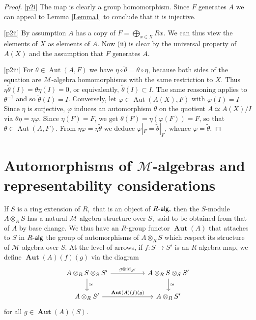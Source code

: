 \documentclass{article}
\theoremstyle{definition}
\def\id{\ensuremath{\operatorname{id}}}
\def\Aut{\ensuremath{\operatorname{Aut}}}
\def\BAut{\ensuremath{\operatorname{\mathbf{Aut}}}}
\def\Ralg{\ensuremath{R\text{-\textup{\textsf{alg}}}}}
\def\Mu{\ensuremath{\mathcal{M}}}
\begin{document}
\begin{proof}
	\ref{p2i} The map is clearly a group homomorphism. Since $F$ generates $A$ we can appeal to Lemma \ref{Lemma1} to conclude that it is injective.

	\ref{p2ii} By assumption $A$ has a copy of $F = \bigoplus_{x \in X} Rx.$ We can thus view the elements of $X$ as elements of $A$. Now (ii) is clear by the universal property of $A(X)$ and the assumption that $F$ generates $A.$

	\ref{p2iii} For $\theta \in \Aut(A,F)$ we have $\eta \circ \widetilde \theta = \theta \circ \eta$, because both sides of the equation are $\Mu$-algebra homomorphisms with the same restriction to $X.$
	Thus $\eta \widetilde \theta (I) = \theta \eta (I) = 0$, or equivalently, $\widetilde \theta(I) \subset I$. The same reasoning applies to $\theta^{-1}$ and so $\widetilde \theta(I) = I$.
	Conversely, let $\varphi \in \Aut(A(X),F)$ with $\varphi(I) = I$. 
	Since $\eta$ is surjective,  
	$\varphi$ induces an automorphism $\theta$ on the quotient $A \simeq A(X)/I$ via $\theta \eta = \eta \varphi$.  Since $\eta(F) = F$, we get $\theta(F) = \eta (\varphi(F)) = F$, so that $\theta \in \Aut(A,F)$.
	From $\eta \varphi = \eta \widetilde \theta$ we deduce $\varphi|_F = \widetilde \theta|_F$, whence $\varphi = \widetilde \theta$.
\end{proof}


\section{Automorphisms of $\Mu$-algebras and representability considerations}

If $S$ is a ring extension of $R,$ that is an object of $\Ralg,$ then the $S$-module $A \otimes_RS$ has a natural $\Mu$-algebra structure over $S,$ said to be obtained from that of $A$ by base change. We thus have an $R$-group functor  $\BAut(A)$ that attaches to $S$ in $\Ralg$ the group of automorphisms of $A\otimes_R S$ which respect its structure of $\Mu$-algebra over $S$.
At the level of arrows, if $f\colon S \to S'$ is an $R$-algebra map, we define $\BAut(A)(f)(g)$ via the diagram
\[ \begin{tikzcd}[column sep = 5em] A \otimes_R S \otimes_S S' \ar[r, "g \otimes \id_{S'}"] \ar[d, "\simeq"] & A\otimes_R S \otimes_S S' \ar[d, "\simeq"] \\ A \otimes_R S' \ar[r, "{\BAut(A)(f)(g)}"] & A \otimes_R S' \end{tikzcd} \]
for all $g \in \BAut(A)(S)$. 
\end{document}
